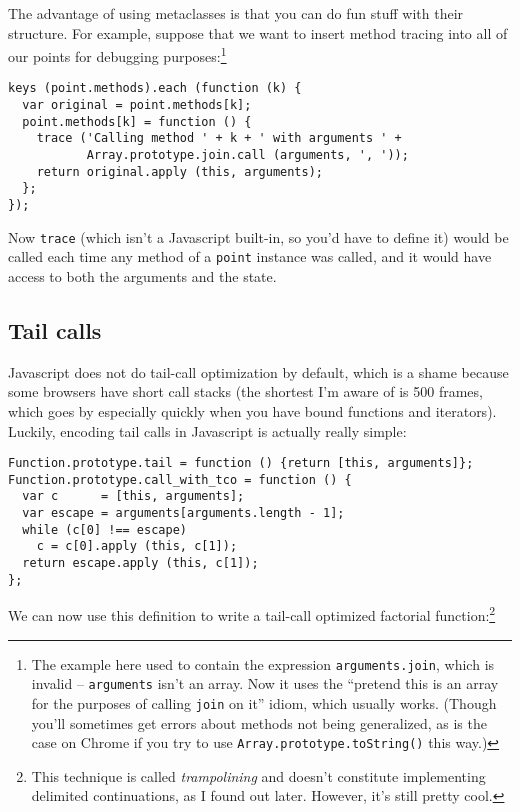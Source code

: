 \documentclass{article}
\begin{document}
    The advantage of using metaclasses is that you can do fun stuff with their structure. For example, suppose that we want to insert method tracing into all of our points for debugging
    purposes:\footnote{The example here used to contain the expression {\tt arguments.join}, which is invalid -- {\tt arguments} isn't an array. Now it uses the ``pretend this is an array for
    the purposes of calling {\tt join} on it'' idiom, which usually works. (Though you'll sometimes get errors about methods not being generalized, as is the case on Chrome if you try to use
    {\tt Array.prototype.toString()} this way.)}

\begin{verbatim}
keys (point.methods).each (function (k) {
  var original = point.methods[k];
  point.methods[k] = function () {
    trace ('Calling method ' + k + ' with arguments ' +
           Array.prototype.join.call (arguments, ', '));
    return original.apply (this, arguments);
  };
});
\end{verbatim}

    Now \verb|trace| (which isn't a Javascript built-in, so you'd have to define it) would be called each time any method of a \verb|point| instance was called, and it would have access to
    both the arguments and the state.

\subsection {Tail calls}
    Javascript does not do tail-call optimization by default, which is a shame because some browsers have short call stacks (the shortest I'm aware of is 500 frames, which goes by especially
    quickly when you have bound functions and iterators). Luckily, encoding tail calls in Javascript is actually really simple:

\begin{verbatim}
Function.prototype.tail = function () {return [this, arguments]};
Function.prototype.call_with_tco = function () {
  var c      = [this, arguments];
  var escape = arguments[arguments.length - 1];
  while (c[0] !== escape)
    c = c[0].apply (this, c[1]);
  return escape.apply (this, c[1]);
};
\end{verbatim}

    We can now use this definition to write a tail-call optimized factorial function:\footnote{This technique is called {\em trampolining} and doesn't constitute implementing delimited
    continuations, as I found out later. However, it's still pretty cool.}
\end{document}
